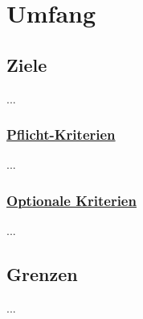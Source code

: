 %

%
\chapter{Umfang}
\label{Umfang}


%
\section{Ziele}

...
\\

% 
%
\subsection{\underline{Pflicht-Kriterien}}

...
\\


\subsection{\underline{Optionale Kriterien}}

...
\\


\section{Grenzen}

...
\\



